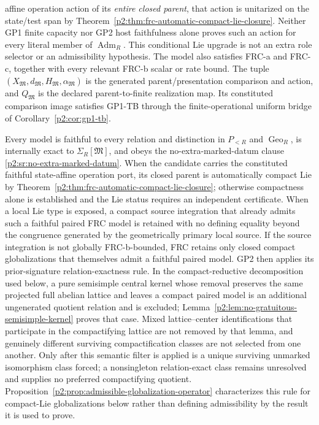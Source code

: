 \documentclass[12pt,a4paper]{article}
\begin{document}
\begin{definition}
affine operation action of its \emph{entire closed parent}, that action is
unitarized on the state/test span by
Theorem~\ref{p2:thm:frc-automatic-compact-lie-closure}.  Neither GP1
finite capacity nor GP2 host faithfulness alone proves such an action for
every literal member of \(\operatorname{Adm}_R\).  This conditional Lie
upgrade is not an extra role selector or an admissibility hypothesis.  The model
also satisfies FRC-a and FRC-c, together with every relevant FRC-b
scalar or rate bound.  The tuple
\((X_{\mathfrak M},d_{\mathfrak M},H_{\mathfrak M},\alpha_{\mathfrak M})\)
is the generated parent/presentation comparison and action, and
\(Q_{\mathfrak M}\) is the declared parent-to-finite realization map.  Its
constituted comparison image satisfies GP1-TB through the finite-operational
uniform bridge of Corollary~\ref{p2:cor:gp1-tb}.

Every model is faithful to every relation and distinction in \(P_{<R}\) and
\(\operatorname{Geo}_R\), is internally exact to
\(\Sigma_R[\mathfrak M]\), and obeys the no-extra-marked-datum clause
\ref{p2:sr:no-extra-marked-datum}.  When the candidate carries the constituted faithful state-affine
operation port, its closed parent is automatically compact Lie by
Theorem~\ref{p2:thm:frc-automatic-compact-lie-closure}; otherwise
compactness alone is established and the Lie status requires an independent
certificate.  When a local Lie type
is exposed, a compact source integration that already admits such a faithful
paired FRC model is retained with no defining equality beyond the congruence
generated by the geometrically primary local source.  If the source integration is not globally FRC-b-bounded, FRC retains
only closed compact globalizations that themselves admit a faithful paired
model.  GP2 then applies its prior-signature relation-exactness rule.  In the
compact-reductive decomposition used below, a pure semisimple central kernel
whose removal preserves the same projected full abelian lattice and leaves a
compact paired model is an additional ungenerated quotient relation and is
excluded; Lemma~\ref{p2:lem:no-gratuitous-semisimple-kernel} proves that
case.  Mixed lattice--center identifications that participate in the
compactifying lattice are not removed by that lemma, and genuinely different
surviving compactification classes are not selected from one another.  Only
after this semantic filter is applied is a unique surviving unmarked
isomorphism class forced; a nonsingleton relation-exact class remains
unresolved and supplies no preferred compactifying quotient.
Proposition~\ref{p2:prop:admissible-globalization-operator} characterizes
this rule for compact-Lie globalizations below rather than defining
admissibility by the result it is used to prove.


\end{definition}
\end{document}
